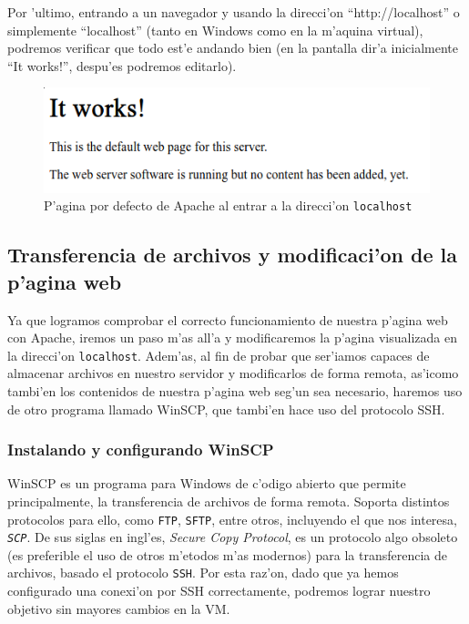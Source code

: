 \documentclass[11pt]{article}
\begin{document}
		Por 'ultimo, entrando a un navegador y usando la direcci'on ``http://localhost'' o simplemente ``localhost'' (tanto en Windows como en la m'aquina virtual), podremos verificar que todo est'e andando bien (en la pantalla dir'a inicialmente  ``It works!'', despu'es podremos editarlo).
		
	\begin{figure}[H]
		\centering
		\includegraphics[width=.8\linewidth]{Images/Apache/fig7.png}
		\caption{P'agina por defecto de Apache al entrar a la direcci'on \texttt{localhost}}
		\label{fig:6}
	\end{figure}
		
	\subsection{Transferencia de archivos y modificaci'on de la p'agina web}
	
	Ya que logramos comprobar el correcto funcionamiento de nuestra p'agina web con Apache, iremos un paso m'as all'a y modificaremos la p'agina visualizada en la direcci'on \texttt{localhost}. Adem'as, al fin de probar que ser'iamos capaces de almacenar archivos en nuestro servidor y modificarlos de forma remota, as'icomo tambi'en los contenidos de nuestra p'agina web seg'un sea necesario, haremos uso de otro programa llamado WinSCP, que tambi'en hace uso del protocolo SSH.
	
	\subsubsection{Instalando y configurando WinSCP}
	
	WinSCP es un programa para Windows de c'odigo abierto que permite principalmente, la transferencia de archivos de forma remota. Soporta distintos protocolos para ello, como \texttt{FTP}, \texttt{SFTP}, entre otros, incluyendo el que nos interesa, \texttt{\em{SCP}}. De sus siglas en ingl'es, \textit{Secure Copy Protocol}, es un protocolo algo obsoleto (es preferible el uso de otros m'etodos m'as modernos) para la transferencia de archivos, basado el protocolo \texttt{SSH}. Por esta raz'on, dado que ya hemos configurado una conexi'on por SSH correctamente, podremos lograr nuestro objetivo sin mayores cambios en la VM.
	
\end{document}
